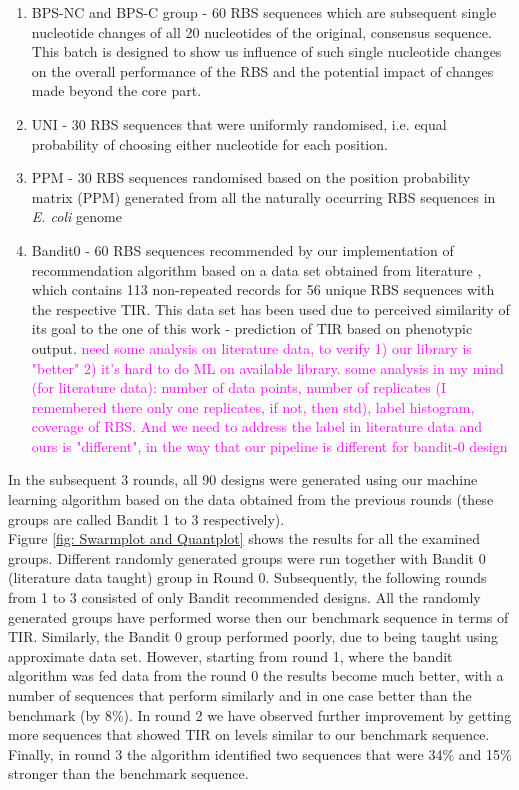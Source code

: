 \documentclass{article}
\newcommand{\mengyan}[1]{\textcolor{magenta}{#1}}
\begin{document}
\begin{enumerate}
    \item BPS-NC and BPS-C group - 60 RBS sequences which are subsequent single nucleotide changes of all 20 nucleotides of the original, consensus sequence. This batch is designed to show us influence of such single nucleotide changes on the overall performance of the RBS and the potential impact of changes made beyond the core part.
    \item UNI - 30 RBS sequences that were  uniformly randomised, i.e. equal probability of choosing either nucleotide for each position. 
    \item PPM - 30 RBS sequences randomised based on the position probability matrix (PPM) generated from all the naturally occurring RBS sequences in \emph{E. coli} genome \cite{Stormo1982}
    \item Bandit0 - 60 RBS sequences recommended by our implementation of recommendation algorithm based on a data set obtained from literature \cite{jervis2018machine}, which contains 113 non-repeated records for 56 unique RBS sequences with the respective TIR.
    This data set has been used due to perceived similarity of its goal to the one of this work - prediction of TIR based on phenotypic output.
    \mengyan{need some analysis on literature data, to verify 1) our library is "better" 2) it's hard to do ML on available library. some analysis in my mind (for literature data): number of data points, number of replicates (I remembered there only one replicates, if not, then std), label histogram, coverage of RBS.
    And we need to address the label in literature data and ours is "different", in the way that our pipeline is different for bandit-0 design}
\end{enumerate}

In the subsequent 3 rounds, all 90 designs were generated using our machine learning algorithm based on the data obtained from the previous rounds (these groups are called Bandit 1 to 3 respectively). \\

Figure \ref{fig: Swarmplot and Quantplot} shows the results for all the examined groups. 
Different randomly generated groups were run together with Bandit 0 (literature data taught) group in Round 0.
Subsequently, the following rounds from 1 to 3 consisted of only Bandit recommended designs.
All the randomly generated groups have performed worse then our benchmark sequence in terms of TIR. 
Similarly, the Bandit 0 group performed poorly, due to being taught using approximate data set.
However, starting from round 1, where the bandit algorithm was fed data from the round 0 the results become much better, with a number of sequences that perform similarly and in one case better than the benchmark (by 8\%).
In round 2 we have observed further improvement by getting more sequences that showed TIR on levels similar to our benchmark sequence.
Finally, in round 3 the algorithm identified two sequences that were 34\% and 15\% stronger than the benchmark sequence.\\
\end{document}
